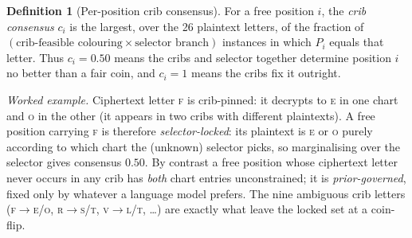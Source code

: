 \documentclass[11pt]{article}
\theoremstyle{plain}
\theoremstyle{definition}
\newtheorem{definition}{Definition}
\begin{document}
\begin{definition}[Per-position crib consensus]\label{def:consensus}
For a free position $i$, the \emph{crib consensus} $c_i$ is the largest, over the 26
plaintext letters, of the fraction of $(\text{crib-feasible colouring}\times
\text{selector branch})$ instances in which $P_i$ equals that letter. Thus $c_i=0.50$
means the cribs and selector together determine position $i$ no better than a fair
coin, and $c_i=1$ means the cribs fix it outright.
\end{definition}

\noindent
\emph{Worked example.} Ciphertext letter \textsc{f} is crib-pinned: it decrypts to
\textsc{e} in one chart and \textsc{o} in the other (it appears in two cribs with
different plaintexts). A free position carrying \textsc{f} is therefore
\emph{selector-locked}: its plaintext is \textsc{e} or \textsc{o} purely according
to which chart the (unknown) selector picks, so marginalising over the selector gives
consensus $0.50$. By contrast a free position whose ciphertext letter never occurs in
any crib has \emph{both} chart entries unconstrained; it is \emph{prior-governed},
fixed only by whatever a language model prefers. The nine ambiguous crib letters
(\textsc{f}$\to$\textsc{e}/\textsc{o}, \textsc{r}$\to$\textsc{s}/\textsc{t},
\textsc{v}$\to$\textsc{l}/\textsc{t}, \dots) are exactly what leave the locked set at a coin-flip.
\end{document}
